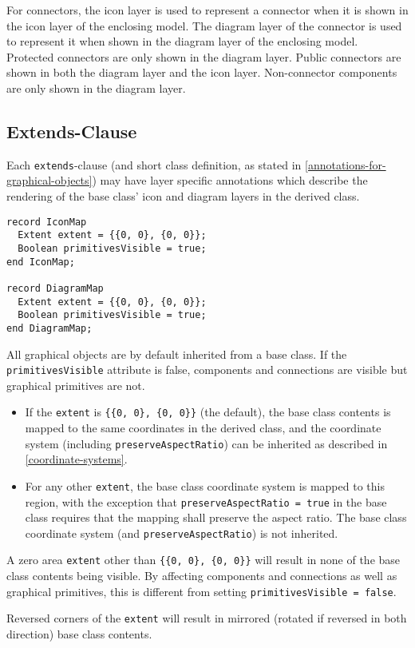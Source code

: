 For connectors, the icon layer is used to represent a connector when it
is shown in the icon layer of the enclosing model. The diagram layer of
the connector is used to represent it when shown in the diagram layer of
the enclosing model. Protected connectors are only shown in the diagram
layer. Public connectors are shown in both the diagram layer and the
icon layer. Non-connector components are only shown in the diagram
layer.

\subsection{Extends-Clause}\label{extends-clause}

Each \lstinline!extends!-clause (and short class definition, as stated in \cref{annotations-for-graphical-objects}) may have layer specific annotations which describe the rendering of the base class' icon and diagram layers in the derived class.

\begin{lstlisting}[language=modelica]
record IconMap
  Extent extent = {{0, 0}, {0, 0}};
  Boolean primitivesVisible = true;
end IconMap;

record DiagramMap
  Extent extent = {{0, 0}, {0, 0}};
  Boolean primitivesVisible = true;
end DiagramMap;
\end{lstlisting}%
All graphical objects are by default inherited from a base class.
If the \lstinline!primitivesVisible! attribute is false, components and connections are visible but graphical primitives are not.

\begin{itemize}
\item
  If the \lstinline!extent! is \lstinline!{{0, 0}, {0, 0}}! (the default), the base class contents is mapped to the same coordinates in the derived class, and the coordinate system (including \lstinline!preserveAspectRatio!) can be inherited as described in \cref{coordinate-systems}.
\item
  For any other \lstinline!extent!, the base class coordinate system is mapped to this region, with the exception that \lstinline!preserveAspectRatio = true! in the base class requires that the mapping shall preserve the aspect ratio.
  The base class coordinate system (and \lstinline!preserveAspectRatio!) is not inherited.
\end{itemize}

\begin{nonnormative}
A zero area \lstinline!extent! other than \lstinline!{{0, 0}, {0, 0}}! will result in none of the base class contents being visible.
By affecting components and connections as well as graphical primitives, this is different from setting \lstinline!primitivesVisible = false!.

Reversed corners of the \lstinline!extent! will result in mirrored (rotated if reversed in both direction) base class contents.
\end{nonnormative}

